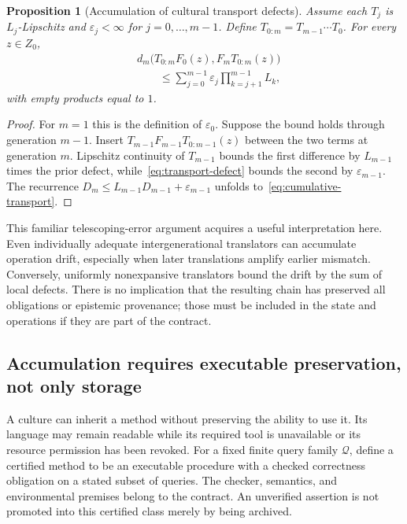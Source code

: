 \documentclass[11pt,letterpaper]{article}
\theoremstyle{plain}
\newtheorem{proposition}{Proposition}[section]
\theoremstyle{definition}
\theoremstyle{remark}
\begin{document}
\begin{proposition}[Accumulation of cultural transport defects]\label{prop:transport}
Assume each $T_j$ is $L_j$-Lipschitz and $\varepsilon_j<\infty$ for $j=0,\ldots,m-1$. Define $T_{0:m}=T_{m-1}\cdots T_0$. For every $z\in Z_0$,
\begin{equation}\label{eq:cumulative-transport}
\begin{split}
&d_m\bigl(T_{0:m}F_0(z),F_mT_{0:m}(z)\bigr)\\
&\qquad\le\sum_{j=0}^{m-1}\varepsilon_j\prod_{k=j+1}^{m-1}L_k,
\end{split}
\end{equation}
with empty products equal to $1$.
\end{proposition}
\begin{proof}
For $m=1$ this is the definition of $\varepsilon_0$. Suppose the bound holds through generation $m-1$. Insert $T_{m-1}F_{m-1}T_{0:m-1}(z)$ between the two terms at generation $m$. Lipschitz continuity of $T_{m-1}$ bounds the first difference by $L_{m-1}$ times the prior defect, while~\eqref{eq:transport-defect} bounds the second by $\varepsilon_{m-1}$. The recurrence $D_m\le L_{m-1}D_{m-1}+\varepsilon_{m-1}$ unfolds to~\eqref{eq:cumulative-transport}.
\end{proof}

This familiar telescoping-error argument acquires a useful interpretation here. Even individually adequate intergenerational translators can accumulate operation drift, especially when later translations amplify earlier mismatch. Conversely, uniformly nonexpansive translators bound the drift by the sum of local defects. There is no implication that the resulting chain has preserved all obligations or epistemic provenance; those must be included in the state and operations if they are part of the contract.


\subsection{Accumulation requires executable preservation, not only storage}
A culture can inherit a method without preserving the ability to use it. Its language may remain readable while its required tool is unavailable or its resource permission has been revoked. For a fixed finite query family $\mathcal Q$, define a certified method to be an executable procedure with a checked correctness obligation on a stated subset of queries. The checker, semantics, and environmental premises belong to the contract. An unverified assertion is not promoted into this certified class merely by being archived.
\end{document}
